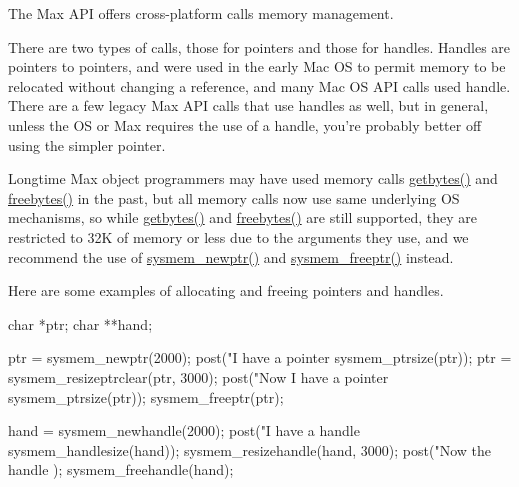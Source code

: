 The Max API offers cross-\/platform calls memory management.

There are two types of calls, those for pointers and those for handles. Handles are pointers to pointers, and were used in the early Mac OS to permit memory to be relocated without changing a reference, and many Mac OS API calls used handle. There are a few legacy Max API calls that use handles as well, but in general, unless the OS or Max requires the use of a handle, you're probably better off using the simpler pointer.

Longtime Max object programmers may have used memory calls \hyperlink{group__memory_gaa513b95a076519ec168b62d85881f643}{getbytes()} and \hyperlink{group__memory_gaa1dc485c42515917ca377dbaf15b7dcd}{freebytes()} in the past, but all memory calls now use same underlying OS mechanisms, so while \hyperlink{group__memory_gaa513b95a076519ec168b62d85881f643}{getbytes()} and \hyperlink{group__memory_gaa1dc485c42515917ca377dbaf15b7dcd}{freebytes()} are still supported, they are restricted to 32K of memory or less due to the arguments they use, and we recommend the use of \hyperlink{group__memory_ga276676be214edff9fe5c9d0681f39ae6}{sysmem\_\-newptr()} and \hyperlink{group__memory_ga200c82639e547869db1f3887d17102d3}{sysmem\_\-freeptr()} instead.

Here are some examples of allocating and freeing pointers and handles.


\begin{DoxyCode}
        char *ptr;
        char **hand;

        ptr = sysmem_newptr(2000);
        post("I have a pointer %
      sysmem_ptrsize(ptr));
        ptr = sysmem_resizeptrclear(ptr, 3000);
        post("Now I have a pointer %
      sysmem_ptrsize(ptr));
        sysmem_freeptr(ptr);

        hand = sysmem_newhandle(2000);
        post("I have a handle %
      sysmem_handlesize(hand));
        sysmem_resizehandle(hand, 3000);
        post("Now the handle %
      );
        sysmem_freehandle(hand);
\end{DoxyCode}
 